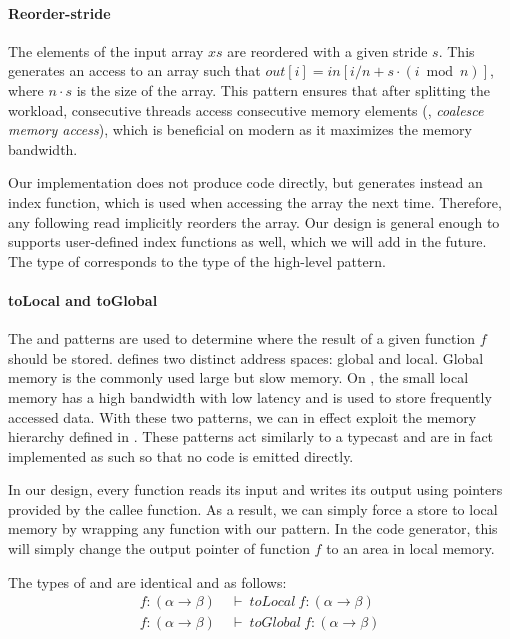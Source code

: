 \paragraph{Reorder-stride}
The elements of the input array $xs$ are reordered with a given stride $s$.
This generates an access to an array such that $out[i] = in[i / n + s \cdot (i \bmod{n})]$, where $n\cdot s$ is the size of the array.
This pattern ensures that after splitting the workload, consecutive threads access consecutive memory elements (\ie, \emph{coalesce memory access}), which is beneficial on modern \GPUs as it maximizes the memory bandwidth.

Our implementation does not produce code directly, but generates instead an index function, which is used when accessing the array the next time.
Therefore, any following read implicitly reorders the array.
Our design is general enough to supports user-defined index functions as well, which we will add in the future.
The type of  corresponds to the type of the high-level  pattern.

\paragraph{toLocal and toGlobal}
The  and  patterns are used to determine where the result of a given function $f$ should be stored.
\OpenCL defines two distinct address spaces: global and local.
Global memory is the commonly used large but slow memory.
On \GPUs, the small local memory has a high bandwidth with low latency and is used to store frequently accessed data.
With these two patterns, we can in effect exploit the memory hierarchy defined in \OpenCL.
These patterns act similarly to a typecast and are in fact implemented as such so that no code is emitted directly.

In our design, every function reads its input and writes its output using pointers provided by the callee function.
As a result, we can simply force a store to local memory by wrapping any function with our  pattern.
In the code generator, this will simply change the output pointer of function $f$ to an area in local memory.

The types of  and  are identical and as follows:
\begin{align}
  f : (\alpha \rightarrow \beta)\ &\vdash\ toLocal\ f : (\alpha \rightarrow \beta)
  \label{eq:type:toLocal}
  \\
  f : (\alpha \rightarrow \beta)\ &\vdash\ toGlobal\ f : (\alpha \rightarrow \beta)
  \label{eq:type:toGlobal}
\end{align}


